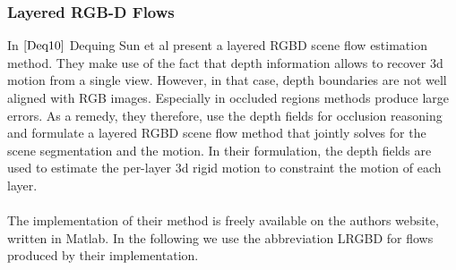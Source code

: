 \subsubsection{Layered RGB-D Flows}
In $\cite{Deq10}$ Dequing Sun et al present a layered RGBD scene flow estimation  method. They make use of the fact that depth information allows to recover 3d motion from a single view. However, in that case, depth boundaries are not well aligned with RGB images. Especially in occluded regions methods produce large errors. As a remedy, they therefore, use the depth fields for occlusion reasoning and formulate a layered RGBD scene flow method that jointly solves for the scene segmentation and the motion. In their formulation, the depth fields are used to estimate the per-layer 3d rigid motion to constraint the motion of each layer. \\ \\
The implementation of their method is freely available on the authors website, written in Matlab. In the following we use the abbreviation LRGBD for flows produced by their implementation. \\ \\


